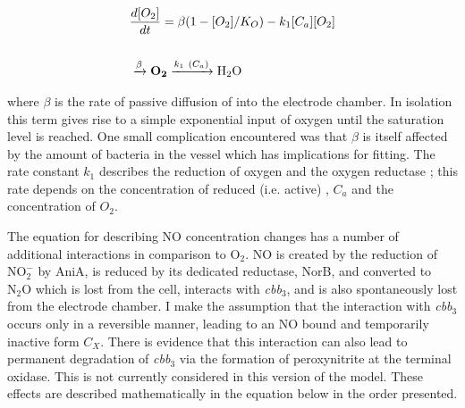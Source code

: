 \begin{eqnarray}
&\frac{d[O_2]}{dt} = \beta(1-[O_2]/K_O) - k_{1}[C_a][O_2] \nonumber \\\nonumber \\
&\xrightarrow{\beta} \mathbf{O_2} \xrightarrow{k_1~(C_a)} \textnormal{H$_\textnormal{2}$O}
\label{eq:oxygen}
\end{eqnarray}

where $\beta$ is the rate of passive diffusion of \cOxygen{} into the electrode chamber. In isolation this term gives rise to a simple exponential input of oxygen until the saturation level is reached. One small complication encountered was that $\beta$ is itself affected by the amount of bacteria in the vessel which has implications for fitting. The rate constant $k_1$ describes the reduction of oxygen and the oxygen reductase \cbbthree{}; this rate depends on the concentration of reduced (i.e. active) \cbbthree{}, $C_a$ and the concentration of $O_2$.

The equation for describing NO concentration changes has a number of additional interactions in comparison to $\mathrm{O}_2$. NO is created by the reduction of $\mathrm{NO}_\mathrm{2}^\mathrm{-}$ by AniA, is reduced by its dedicated reductase, NorB, and converted to $\mathrm{N}_2\mathrm{O}$ which is lost from the cell, interacts with \textit{cbb$_{\textrm{3}}$}, and is also spontaneously lost from the electrode chamber. I make the assumption that the interaction with \textit{cbb$_{\textrm{3}}$} occurs only in a reversible manner, leading to an NO bound and temporarily inactive form $C_X$. There is evidence that this interaction can also lead to permanent degradation of \textit{cbb$_{\textrm{3}}$} via the formation of peroxynitrite at the terminal oxidase. This is not currently considered in this version of the model. These effects are described mathematically in the equation below in the order presented.

